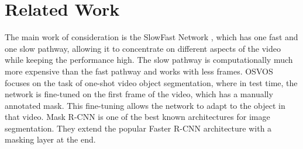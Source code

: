 \section{Related Work}
The main work of consideration is the SlowFast Network \cite{slow_fast}, which has one fast and one slow pathway, allowing it to concentrate on different aspects of the video while keeping the performance high. The slow pathway is computationally much more expensive than the fast pathway and works with less frames. OSVOS \cite{osvos} focuses on the task of one-shot video object segmentation, where in test time, the network is fine-tuned on the first frame of the video, which has a manually annotated mask. This fine-tuning allows the network to adapt to the object in that video. Mask R-CNN \cite{mask_rcnn} is one of the best known architectures for image segmentation. They extend the popular Faster R-CNN architecture with a masking layer at the end.